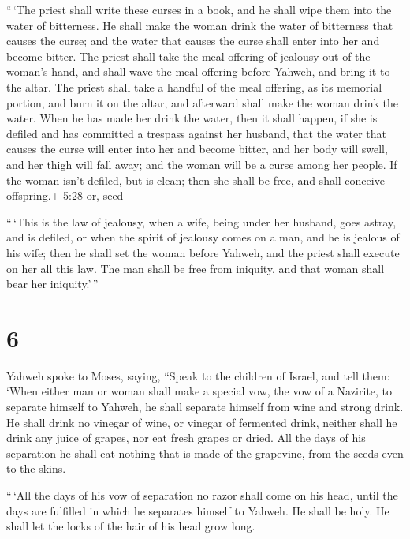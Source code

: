  ``\,`The priest shall write these curses in a book, and he
shall wipe them into the water of bitterness.  He shall
make the woman drink the water of bitterness that causes the curse; and
the water that causes the curse shall enter into her and become bitter.
 The priest shall take the meal offering of jealousy out of
the woman's hand, and shall wave the meal offering before Yahweh, and
bring it to the altar.  The priest shall take a handful of
the meal offering, as its memorial portion, and burn it on the altar,
and afterward shall make the woman drink the water.  When
he has made her drink the water, then it shall happen, if she is defiled
and has committed a trespass against her husband, that the water that
causes the curse will enter into her and become bitter, and her body
will swell, and her thigh will fall away; and the woman will be a curse
among her people.  If the woman isn't defiled, but is
clean; then she shall be free, and shall conceive offspring.+ 5:28 or,
seed

 ``\,`This is the law of jealousy, when a wife, being under
her husband, goes astray, and is defiled,  or when the
spirit of jealousy comes on a man, and he is jealous of his wife; then
he shall set the woman before Yahweh, and the priest shall execute on
her all this law.  The man shall be free from iniquity, and
that woman shall bear her iniquity.'\,''

\hypertarget{section-5}{%
\section{6}\label{section-5}}

 Yahweh spoke to Moses, saying,  ``Speak to the
children of Israel, and tell them: `When either man or woman shall make
a special vow, the vow of a Nazirite, to separate himself to Yahweh,
 he shall separate himself from wine and strong drink. He
shall drink no vinegar of wine, or vinegar of fermented drink, neither
shall he drink any juice of grapes, nor eat fresh grapes or dried.
 All the days of his separation he shall eat nothing that is
made of the grapevine, from the seeds even to the skins.

 ``\,`All the days of his vow of separation no razor shall
come on his head, until the days are fulfilled in which he separates
himself to Yahweh. He shall be holy. He shall let the locks of the hair
of his head grow long.

